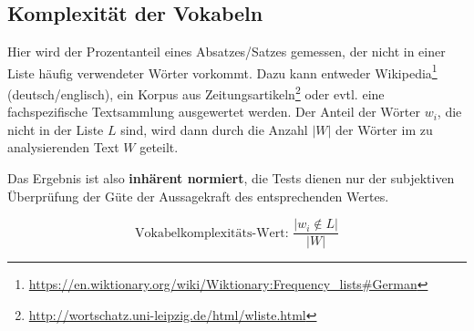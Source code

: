 \documentclass[10pt,a4paper]{article}
\begin{document}
	\subsection*{Komplexität der Vokabeln}
	Hier wird der Prozentanteil eines Absatzes/Satzes gemessen, der nicht in einer Liste häufig verwendeter Wörter vorkommt. Dazu kann entweder Wikipedia\footnote{\url{https://en.wiktionary.org/wiki/Wiktionary:Frequency_lists\#German}} (deutsch/englisch), ein Korpus aus Zeitungsartikeln\footnote{\url{http://wortschatz.uni-leipzig.de/html/wliste.html}} oder evtl. eine fachspezifische Textsammlung ausgewertet werden. Der Anteil der Wörter $ w_i $, die nicht in der Liste $ L $ sind, wird dann durch die Anzahl $ |W| $ der Wörter im zu analysierenden Text $ W $ geteilt. 
	
	Das Ergebnis ist also \textbf{inhärent normiert}, die Tests dienen nur der subjektiven Überprüfung der Güte der Aussagekraft des entsprechenden Wertes.
	
	\begin{equation*}
	\text{Vokabelkomplexitäts-Wert: } \frac{|w_i\not\in L|}{|W|}
	\end{equation*}
	
\end{document}
